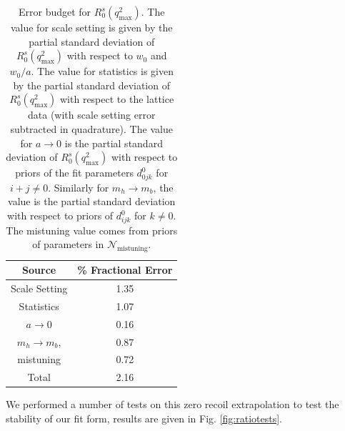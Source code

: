 \begin{table}[htb!]
  \begin{center}
    \begin{tabular}{c c}
      \hline
      Source & \% Fractional Error \\ [0.5ex]
      \hline
      Scale Setting & 1.35  \\ [1ex]
      Statistics & 1.07  \\ [1ex]
      $a\to 0$ & 0.16  \\ [1ex]
      $m_h \to m_b$, & 0.87  \\ [1ex]
      mistuning & 0.72 \\ [1ex]
      \hline
      Total & 2.16 \\ [1ex]
      \hline
    \end{tabular}
  \end{center}
  \caption{Error budget for $R_0^s(q^2_{\text{max}})$. The value for scale setting is given by the partial standard deviation of $R_0^s(q^2_{\text{max}})$ with respect to $w_0$ and $w_0/a$. The value for statistics is given by the partial standard deviation of $R_0^s(q^2_{\text{max}})$ with respect to the lattice data (with scale setting error subtracted in quadrature). The value for $a\to 0$ is the partial standard deviation of $R_0^s(q^2_{\text{max}})$ with respect to priors of the fit parameters $d^0_{0jk}$ for $i+j\neq 0$. Similarly for $m_h\to m_b$, the value is the partial standard deviation with respect to priors of $d^0_{ijk}$ for $k\neq 0$. The mistuning value comes from priors of parameters in $\mathcal{N}_{\text{mistuning}}$.
\label{ratioq2max_budget}}
    
\end{table}

We performed a number of tests on this zero recoil extrapolation to test the stability of our fit form, results are given in Fig. \ref{fig:ratiotests}.

